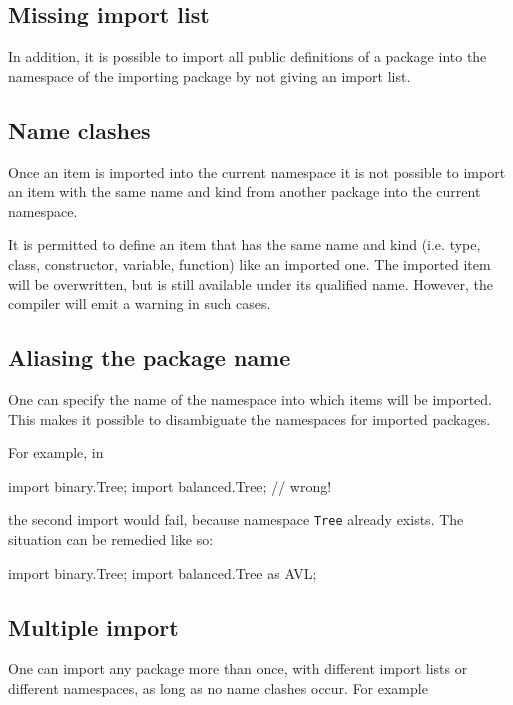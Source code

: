 \subsection{Missing import list}

In addition, it is possible to import all public definitions of a
package into the
namespace of the importing package by not giving an import list.


\subsection{Name clashes}

Once an item is imported into the current namespace it is not possible
to import an item with the same name and kind from another package
into the current namespace.

It is permitted to define an item that has the same name and kind (i.e. type, class, constructor, variable, function) like an imported one. 
The imported item will be overwritten, but is still available under its qualified name. 
However, the compiler will emit a warning in such cases.

\subsection{Aliasing the package name}
One can specify the name of the namespace into which
items will be imported. This makes it possible to disambiguate the
namespaces for imported packages.

For example, in

\begin{code}
import binary.Tree;
import balanced.Tree;    // wrong!
\end{code}

the second import would fail, because namespace \texttt{Tree} already
exists. The situation can be remedied like so:

\begin{code}
import binary.Tree;
import balanced.Tree as AVL;
\end{code}

\subsection{Multiple import}
One can import any package more than once, with different import
lists or different namespaces, as long as no name clashes occur. For
example

